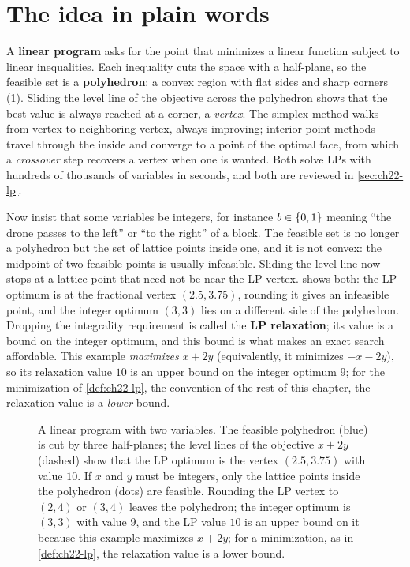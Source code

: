 \section{The idea in plain words}
\label{sec:ch22-intuition}

A \textbf{linear program} asks for the point that
minimizes a linear function subject to linear inequalities. Each inequality
cuts the space with a half-plane, so the feasible set is a
\textbf{polyhedron}: a convex region with flat sides and
sharp corners (\cref{fig:ch22-relaxation}). Sliding the level line of the
objective across the polyhedron shows that the best value is always reached
at a corner, a \emph{vertex}. The simplex method walks from vertex to
neighboring vertex, always improving; interior-point methods travel through
the inside and converge to a point of the optimal face, from which a
\emph{crossover} step recovers a vertex when one is wanted. Both solve LPs with hundreds of
thousands of variables in seconds, and both are reviewed in
\cref{sec:ch22-lp}.

Now insist that some variables be integers, for instance $b \in \left\{ 0,1 \right\}$
meaning ``the drone passes to the left'' or ``to the right'' of a block. The
feasible set is no longer a polyhedron but the set of lattice points inside
one, and it is not convex: the midpoint of two feasible points is usually
infeasible. Sliding the level line now stops at a lattice point that need not
be near the LP vertex.  shows both: the LP optimum
is at the fractional vertex $(2.5, 3.75)$, rounding it gives an infeasible
point, and the integer optimum $(3,3)$ lies on a different side of the
polyhedron. Dropping the integrality requirement is called the
\textbf{LP relaxation}; its value is a bound on the
integer optimum, and this bound is what makes an exact search affordable.
This example \emph{maximizes} $x + 2y$ (equivalently, it minimizes
$-x - 2y$), so its relaxation value $10$ is an upper bound on the integer
optimum $9$; for the minimization of \cref{def:ch22-lp}, the convention of
the rest of this chapter, the relaxation value is a \emph{lower} bound.

\begin{figure}[tb]
  \centering
  \caption{A linear program with two variables. The feasible polyhedron
  (blue) is cut by three half-planes; the level lines of the objective
  $x + 2y$ (dashed) show that the LP optimum is the vertex $(2.5, 3.75)$ with
  value $10$. If $x$ and $y$ must be integers, only the lattice points inside
  the polyhedron (dots) are feasible. Rounding the LP vertex to $(2,4)$ or
  $(3,4)$ leaves the polyhedron; the integer optimum is $(3,3)$ with value
  $9$, and the LP value $10$ is an upper bound on it because this example
  maximizes $x + 2y$; for a minimization, as in \cref{def:ch22-lp}, the
  relaxation value is a lower bound.}
  \label{fig:ch22-relaxation}
\end{figure}

